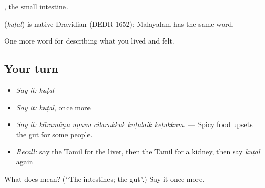 , the small intestine.

\begin{cousinweb}
\textbf{} (\emph{kuṭal}) is native Dravidian (DEDR 1652); Malayalam has the same word.
\end{cousinweb}

\begin{grammarlens}[title={What you've built}]
One more word for describing what you lived and felt.
\end{grammarlens}

\subsection*{Your turn}
\begin{itemize}
\raggedright
  \item \emph{Say it:} \emph{kuṭal}
  \item \emph{Say it:} \emph{kuṭal}, once more
  \item \emph{Say it:} \emph{kāramāṉa uṇavu cilarukkuk kuṭalaik keṭukkum.} — Spicy food upsets the gut for some people.
  \item \emph{Recall:} say the Tamil for the liver, then the Tamil for a kidney, then say \emph{kuṭal} again
\end{itemize}

\begin{tcolorbox}[breakable,colback=teal!4,colframe=teal!35!black,title={Before you move on}]
What does  mean? (\textquotedblleft{}The intestines; the gut\textquotedblright{}.) Say it once more.
\end{tcolorbox}
